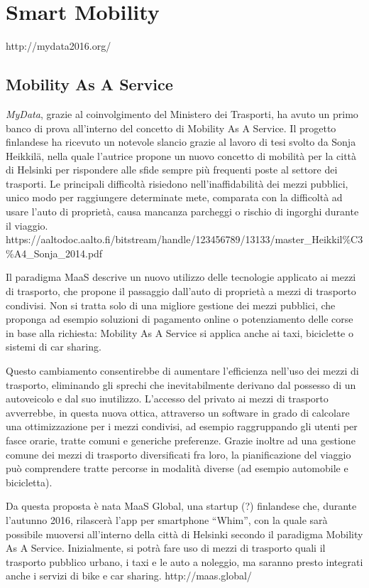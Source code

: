 \chapter{Smart Mobility}
\label{capitolo2}
\thispagestyle{empty}

http://mydata2016.org/
\section{Mobility As A Service}
\textit{MyData}, grazie al coinvolgimento del Ministero dei Trasporti, ha avuto un primo banco di prova all’interno del concetto di Mobility As A Service. Il progetto finlandese ha ricevuto un notevole slancio grazie al lavoro di tesi svolto da Sonja Heikkil\"a, nella quale l’autrice propone un nuovo concetto di mobilit\`a per la citt\`a di Helsinki per rispondere alle sfide sempre pi\`u frequenti poste al settore dei trasporti. Le principali difficolt\`a risiedono nell’inaffidabilit\`a dei mezzi pubblici, unico modo per raggiungere determinate mete, comparata con la difficolt\`a ad usare l’auto di propriet\`a, causa mancanza parcheggi o rischio di ingorghi durante il viaggio. https://aaltodoc.aalto.fi/bitstream/handle/123456789/13133/master\_Heikkil\%C3\%A4\_Sonja\_2014.pdf

Il paradigma MaaS descrive un nuovo utilizzo delle tecnologie applicato ai mezzi di trasporto, che propone il passaggio dall’auto di propriet\`a a mezzi di trasporto condivisi. Non si tratta solo di una migliore gestione dei mezzi pubblici, che proponga ad esempio soluzioni di pagamento online o potenziamento delle corse in base alla richiesta: Mobility As A Service si applica anche ai taxi, biciclette o sistemi di car sharing. 

Questo cambiamento consentirebbe di aumentare l’efficienza nell’uso dei mezzi di trasporto, eliminando gli sprechi che inevitabilmente derivano dal possesso di un autoveicolo e dal suo inutilizzo. L’accesso del privato ai mezzi di trasporto avverrebbe, in questa nuova ottica, attraverso un software in grado di calcolare una ottimizzazione per i mezzi condivisi, ad esempio raggruppando gli utenti per fasce orarie, tratte comuni e generiche preferenze. Grazie inoltre ad una gestione comune dei mezzi di trasporto diversificati fra loro, la pianificazione del viaggio pu\`o comprendere tratte percorse in modalit\`a diverse (ad esempio automobile e bicicletta).

Da questa proposta \`e nata MaaS Global, una startup (?) finlandese che, durante l’autunno 2016, rilascer\`a l’app per smartphone “Whim”, con la quale sar\`a possibile muoversi all’interno della citt\`a di Helsinki secondo il paradigma Mobility As A Service. Inizialmente, si potr\`a fare uso di mezzi di trasporto quali il trasporto pubblico urbano, i taxi e le auto a noleggio, ma saranno presto integrati anche i servizi di bike e car sharing. http://maas.global/

